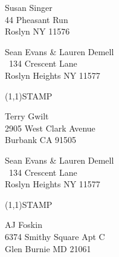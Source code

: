 \documentclass[12pt]{article}
\begin{document}
\begin{center} \begin{Huge} \vspace*{\fill}
Susan Singer\\
44 Pheasant Run\\
Roslyn NY 11576\\
\vspace{\fill} \end{Huge} \end{center}

\clearpage

\begin{minipage}{.5\linewidth} \noindent
Sean Evans \& Lauren Demell\\\ 
134 Crescent Lane\\ 
Roslyn Heights NY 11577
\end{minipage}
\begin{minipage}{.5\linewidth \hspace{-.2in} \vspace{-.3in}}
\begin{flushright}
\framebox(1,1){STAMP}
\end{flushright}
\end{minipage}

\begin{center} \begin{Huge} \vspace*{\fill}
Terry Gwilt\\
2905 West Clark Avenue\\
Burbank CA 91505\\
\vspace{\fill} \end{Huge} \end{center}

\clearpage

\begin{minipage}{.5\linewidth} \noindent
Sean Evans \& Lauren Demell\\\ 
134 Crescent Lane\\ 
Roslyn Heights NY 11577
\end{minipage}
\begin{minipage}{.5\linewidth \hspace{-.2in} \vspace{-.3in}}
\begin{flushright}
\framebox(1,1){STAMP}
\end{flushright}
\end{minipage}

\begin{center} \begin{Huge} \vspace*{\fill}
AJ Foskin\\
6374 Smithy Square Apt C\\
Glen Burnie MD 21061\\
\vspace{\fill} \end{Huge} \end{center}
\end{document}
